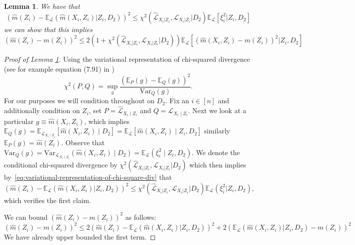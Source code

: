 \documentclass[12pt]{article}
\newtheorem{lemma}{Lemma}
\theoremstyle{definition}
\theoremstyle{remark}
\newcommand{\E}{\mathbb E}								%
\newcommand{\srx}{X}									%
\newcommand{\srz}{Z}									%
\newcommand{\law}{\mathcal L}							%
\newcommand{\lawhat}{\widehat{\mathcal L}}				%
\begin{document}
\begin{lemma} \label{lemma:estimation-error-to-chi-square-div}
	We have that
	$$
	(\widehat m(\srz_i) - \E_{\law} (\widehat m(\srx_i,\srz_i) |\srz_i,D_2) )^2 \leq \chi^2\left(\lawhat_{\srx_i|\srz_i}, \law_{\srx_i|\srz_i} | D_2\right) \E_\law[\xi_i^2|\srz_i,D_2]
	$$
	we can show that this implies
	\begin{equation*}
		(\widehat m(\srz_i) -m(\srz_i) )^2 \leq 2\left ( 1 + \chi^2\left(\lawhat_{\srx_i|\srz_i}, \law_{\srx_i|\srz_i} | D_2\right) \right) \E_\law[ (\widehat m (\srx_i,\srz_i) - m(\srz_i))^2|\srz_i, D_2]
	\end{equation*}
\end{lemma}
\begin{proof}[Proof of Lemma \ref{lemma:estimation-error-to-chi-square-div}]
	Using the variational representation of chi-squared divergence (see for example equation (7.91) in \citet{Polyanskiy2023})
	\begin{equation}\label{eq:variational-representation-of-chi-square-div}
		\chi^2(P,Q) = \sup_g \frac{(\E_P(g) - \E_Q(g))^2}{\mathrm{Var}_Q(g)} .
	\end{equation}  
	For our purposes we will condition throughout on $D_2$. Fix an $i\in[n]$ and additionally condition on $\srz_i$, set $P = \widehat{\law}_{\srx_i \mid \srz_i}$ and $Q = \law_{\srx_i \mid \srz_i}$. Next we look at a particular $g \equiv \widehat m(\srx_i,\srz_i)$, which implies $\E_Q(g) = \E_{\law_{\srx_i \mid \srz_i}}[\widehat m(\srx_i, \srz_i)\mid D_2] = \E_\law[\widehat m(\srx_i, \srz_i)\mid \srz_i, D_2]$ similarly $\E_P(g) = \widehat m(\srz_i)$. Observe that $\mathrm{Var}_Q(g) = \mathrm{Var}_{\law_{\srx_i \mid \srz_i}}(\widehat m(\srx_i, \srz_i)\mid D_2) = \E_\law (\xi_i^2\mid \srz_i,D_2)$. We denote the conditional chi-squared divergence by $\chi^2\left(\lawhat_{\srx_i|\srz_i}, \law_{\srx_i|\srz_i} | D_2\right)$ which then implies by~\eqref{eq:variational-representation-of-chi-square-div} that
	$$
	(\widehat m(\srz_i) - \E_{\law} (\widehat m(\srx_i,\srz_i) |\srz_i,D_2) )^2 \leq \chi^2\left(\lawhat_{\srx_i|\srz_i}, \law_{\srx_i|\srz_i} | D_2\right) \E_\law(\xi_i^2|\srz_i,D_2),
	$$ 
	which verifies the first claim.
	
	We can bound $	(\widehat m(\srz_i) -m(\srz_i) )^2$ as follows:
	\begin{equation}\label{eq:decomposing-the-error-in-regression-of-Y-given-Z}
		(\widehat m(\srz_i) -m(\srz_i) )^2 \leq 2(\widehat m(\srz_i) - \E_{\law} (\widehat m(\srx_i,\srz_i) |\srz_i,D_2) )^2 + 2(\E_{\law} (\widehat m(\srx_i,\srz_i) |\srz_i,D_2) - m(\srz_i) )^2
	\end{equation}
	We have already upper bounded the first term. 
	

\end{proof}
\end{document}

